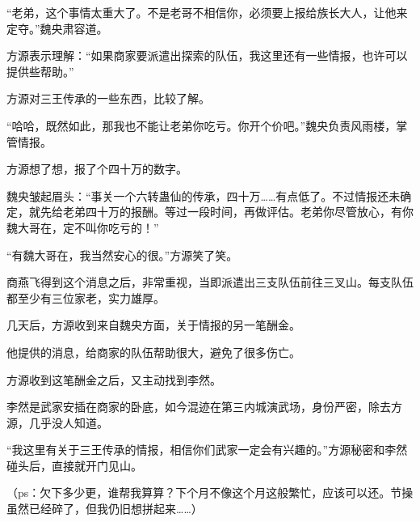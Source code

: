 \begin{this_body}
“老弟，这个事情太重大了。不是老哥不相信你，必须要上报给族长大人，让他来定夺。”魏央肃容道。

方源表示理解：“如果商家要派遣出探索的队伍，我这里还有一些情报，也许可以提供些帮助。”

方源对三王传承的一些东西，比较了解。

“哈哈，既然如此，那我也不能让老弟你吃亏。你开个价吧。”魏央负责风雨楼，掌管情报。

方源想了想，报了个四十万的数字。

魏央皱起眉头：“事关一个六转蛊仙的传承，四十万……有点低了。不过情报还未确定，就先给老弟四十万的报酬。等过一段时间，再做评估。老弟你尽管放心，有你魏大哥在，定不叫你吃亏的！”

“有魏大哥在，我当然安心的很。”方源笑了笑。

商燕飞得到这个消息之后，非常重视，当即派遣出三支队伍前往三叉山。每支队伍都至少有三位家老，实力雄厚。

几天后，方源收到来自魏央方面，关于情报的另一笔酬金。

他提供的消息，给商家的队伍帮助很大，避免了很多伤亡。

方源收到这笔酬金之后，又主动找到李然。

李然是武家安插在商家的卧底，如今混迹在第三内城演武场，身份严密，除去方源，几乎没人知道。

“我这里有关于三王传承的情报，相信你们武家一定会有兴趣的。”方源秘密和李然碰头后，直接就开门见山。

（ps：欠下多少更，谁帮我算算？下个月不像这个月这般繁忙，应该可以还。节操虽然已经碎了，但我仍旧想拼起来……）

\end{this_body}

